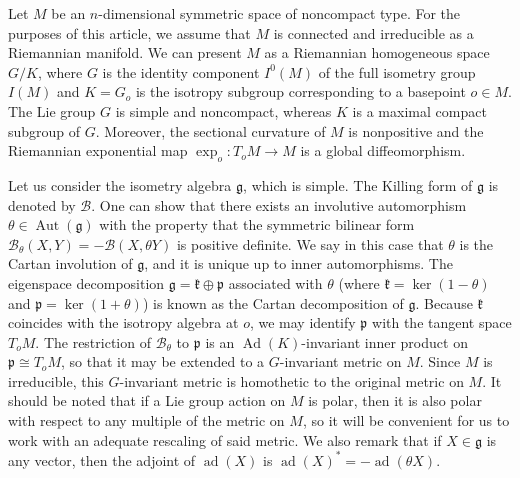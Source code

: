\documentclass[12pt, a4paper]{amsart}
\newcommand{\g}{\mathfrak}
\newcommand{\ad}{\operatorname{ad}}
\newcommand{\Ad}{\operatorname{Ad}}
\newcommand{\Aut}{\operatorname{Aut}}
\theoremstyle{definition}
\begin{document}
Let $M$ be an $n$-dimensional symmetric space of noncompact type.
For the purposes of this article, we assume that $M$ is connected and irreducible as a Riemannian manifold.
We can present $M$ as a Riemannian homogeneous space $G/K$, where $G$ is the identity component $I^0(M)$ of the full isometry group $I(M)$ and $K=G_o$ is the isotropy subgroup corresponding to a basepoint $o\in M$.
The Lie group $G$ is simple and noncompact, whereas $K$ is a maximal compact subgroup of $G$.
Moreover, the sectional curvature of $M$ is nonpositive and the Riemannian exponential map $\exp_o\colon T_o M\to M$ is a global diffeomorphism.

Let us consider the isometry algebra $\g{g}$, which is simple.
The Killing form of $\g{g}$ is denoted by $\mathcal{B}$.
One can show that there exists an involutive automorphism $\theta\in \Aut(\g{g})$ with the property that the symmetric bilinear form $\mathcal{B}_{\theta}(X,Y)=-\mathcal{B}(X,\theta Y)$ is positive definite.
We say in this case that $\theta$ is the Cartan involution of $\g{g}$, and it is unique up to inner automorphisms.
The eigenspace decomposition $\g{g}=\g{k}\oplus\g{p}$ associated with $\theta$ (where $\g{k}=\ker(1-\theta)$ and $\g{p}=\ker(1+\theta)$) is known as the Cartan decomposition of $\g{g}$.
Because $\g{k}$ coincides with the isotropy algebra at $o$, we may identify $\g{p}$ with the tangent space $T_o M$.
The restriction of $\mathcal{B}_\theta$ to $\g{p}$ is an $\Ad(K)$-invariant inner product on $\g{p}\cong T_o M$, so that it may be extended to a $G$-invariant metric on $M$.
Since $M$ is irreducible, this $G$-invariant metric is homothetic to the original metric on $M$.
It should be noted that if a Lie group action on $M$ is polar, then it is also polar with respect to any multiple of the metric on $M$, so it will be convenient for us to work with an adequate rescaling of said metric.
We also remark that if $X\in\g{g}$ is any vector, then the adjoint of $\ad(X)$ is $\ad(X)^{*}=-\ad(\theta X)$.
\end{document}
